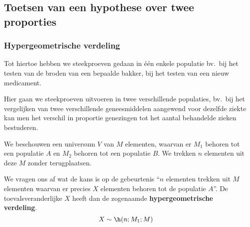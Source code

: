 {%






\newpage
\subsection{Toetsen van een hypothese over twee proporties} 
\subsubsection{Hypergeometrische verdeling}
Tot hiertoe hebben we steekproeven gedaan in  
\'e\'en enkele populatie bv.\ bij het testen van de broden van een bepaalde 
bakker, bij het testen van een nieuw medicament.

Hier gaan we steekproeven uitvoeren in twee verschillende populaties, bv.\ 
bij het vergelijken van twee verschillende geneesmiddelen aangewend voor 
dezelfde 
ziekte kan men het verschil in proportie genezingen tot het aantal behandelde 
zieken bestuderen. 




We beschouwen een universum $V$ van $M$ elementen, waarvan er $M_1$ behoren tot een
populatie $A$ en $M_2$ behoren tot een populatie $B$. We trekken $n$ elementen 
uit deze $M$ zonder terugplaatsen. 

We vragen ons af wat de kans is op de gebeurtenis ``$n$ elementen trekken uit 
$M$ elementen waarvan er precies $X$ elementen behoren tot de 
populatie $A$''. De toevalsveranderlijke $X$ heeft dan de zogenaamde {\bf hypergeometrische verdeling}. 
$$X\sim\h(n;M_1;M)$$
}

